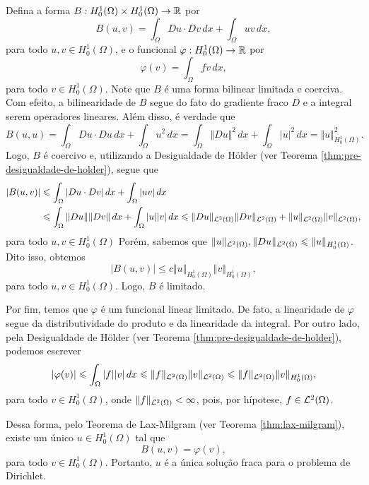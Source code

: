 Defina a forma $B : H^1_0(\Omega) \times H^1_0(\Omega) \to \mathbb{R}$ por
\[
    B(u,v)=\int_\Omega Du \cdot Dv \,dx + \int_{\Omega} uv \,dx,
\]
para todo $u, v \in H^1_0(\Omega)$,
e o funcional $\varphi : H^1_0(\Omega) \to \mathbb{R}$ por
\[
    \varphi(v) = \int_\Omega fv \,dx,
\]
para todo $v \in H^1_0(\Omega)$.
Note que $B$ é uma forma bilinear limitada e coerciva. Com efeito, a bilinearidade de $B$ segue do fato do gradiente fraco $D$ e a integral serem operadores lineares. Além disso, é verdade que
\[
    B(u,u) = \int_\Omega Du \cdot Du \,dx + \int_\Omega u^2 \,dx
    = \int_\Omega \Vert Du \Vert^2 \,dx + \int_\Omega |u|^2 \,dx 
    = \Vert u \Vert_{H^1_0(\Omega)}^2.
\]
Logo, $B$ é coercivo e, utilizando a Desigualdade de Hölder (ver Teorema \ref{thm:pre-desigualdade-de-holder}), segue que
\[
    \begin{aligned}
        |B(u,v)| &\leqslant \int_\Omega |Du \cdot Dv | \,dx + \int_\Omega |u v | \,dx\\ &\leqslant \int_\Omega \Vert Du \Vert \Vert Dv \Vert \,dx + \int_\Omega |u| |v| \,dx \leqslant \Vert Du \Vert_{\mathcal{L}^2(\Omega)}\Vert Dv \Vert_{\mathcal{L}^2(\Omega)} + \Vert u \Vert_{\mathcal{L}^2(\Omega)}\Vert v \Vert_{\mathcal{L}^2(\Omega)},
    \end{aligned}
\]
para todo $u, v \in H^1_0(\Omega)$
Porém, sabemos que $\Vert u \Vert_{\mathcal{L}^2(\Omega)}, \Vert Du \Vert_{\mathcal{L}^2(\Omega)} \leqslant \Vert u \Vert_{H^1_0(\Omega)}$.
Dito isso, obtemos
\[
    |B(u,v)| \leqslant c \Vert u \Vert_{H^1_0(\Omega)} \Vert v \Vert_{H^1_0(\Omega)},
\]
para todo $u, v \in H^1_0(\Omega)$. Logo, $B$ é limitado.

Por fim, temos que $\varphi$ é um funcional linear limitado.
De fato, a linearidade de $\varphi$ segue da distributividade do produto e da linearidade da integral.
Por outro lado, pela Desigualdade de Hölder (ver Teorema \ref{thm:pre-desigualdade-de-holder}), podemos escrever
\[
    |\varphi(v)| \leqslant \int_\Omega |f| |v| \,dx \leqslant \Vert f \Vert_{\mathcal{L}^2(\Omega)} \Vert v \Vert_{\mathcal{L}^2(\Omega)} \leqslant \Vert f \Vert_{\mathcal{L}^2(\Omega)} \Vert v \Vert_{H^1_0(\Omega)},
\]
para todo $v \in H^1_0(\Omega)$, onde $\Vert f \Vert_{\mathcal{L}^2(\Omega)} < \infty$, pois, por hípotese, $f \in \mathcal{L}^2(\Omega)$.

Dessa forma, pelo Teorema de Lax-Milgram (ver Teorema \ref{thm:lax-milgram}), existe um único $u \in H^1_0(\Omega)$ tal que
\[
    B(u,v) = \varphi(v),
\]
para todo $v \in H^1_0(\Omega)$.
Portanto, $u$ é a única solução fraca para o problema de Dirichlet.
